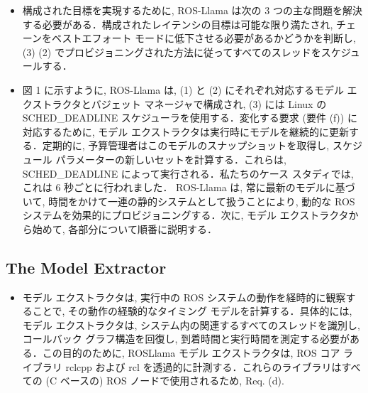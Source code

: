 \begin{frame}{}
    \begin{itemize}
        \item 構成された目標を実現するために, ROS-Llama は次の 3 つの主な問題を解決する必要がある．構成されたレイテンシの目標は可能な限り満たされ, チェーンをベストエフォート モードに低下させる必要があるかどうかを判断し, (3) (2) でプロビジョニングされた方法に従ってすべてのスレッドをスケジュールする．
    \end{itemize}
\end{frame}

\begin{frame}{}
    \begin{itemize}
        \item 図 1 に示すように, ROS-Llama は, (1) と (2) にそれぞれ対応するモデル エクストラクタとバジェット マネージャで構成され, (3) には Linux の SCHED\_DEADLINE スケジューラを使用する．変化する要求 (要件 (f)) に対応するために, モデル エクストラクタは実行時にモデルを継続的に更新する．定期的に, 予算管理者はこのモデルのスナップショットを取得し, スケジュール パラメーターの新しいセットを計算する．これらは, SCHED\_DEADLINE によって実行される．私たちのケース スタディでは, これは 6 秒ごとに行われました． ROS-Llama は, 常に最新のモデルに基づいて, 時間をかけて一連の静的システムとして扱うことにより, 動的な ROS システムを効果的にプロビジョニングする．次に, モデル エクストラクタから始めて, 各部分について順番に説明する．
    \end{itemize}
\end{frame}


\subsection{The Model Extractor}
\label{ssec: the model extractor}

\begin{frame}{}
    \begin{itemize}
        \item モデル エクストラクタは, 実行中の ROS システムの動作を経時的に観察することで, その動作の経験的なタイミング モデルを計算する．具体的には, モデル エクストラクタは, システム内の関連するすべてのスレッドを識別し, コールバック グラフ構造を回復し, 到着時間と実行時間を測定する必要がある．この目的のために, ROSLlama モデル エクストラクタは, ROS コア ライブラリ $\mathrm{rclcpp}$ および $\mathrm{rcl}$ を透過的に計測する．これらのライブラリはすべての (C ベースの) ROS ノードで使用されるため, Req. (d).
    \end{itemize}
\end{frame}

